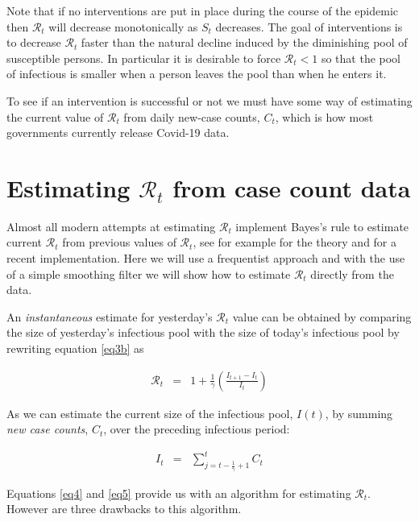 \documentclass[11pt]{article}
\begin{document}
Note that if no interventions are put in place during the course of the epidemic 
then $\mathcal{R}_t$ will decrease monotonically as $S_t$ decreases.
The goal of interventions is to decrease $\mathcal{R}_t$ faster than
the natural decline induced by the diminishing pool of susceptible persons.
In particular it is desirable to force $\mathcal{R}_t < 1$ so that 
the pool of infectious is smaller when a person leaves the pool
than when he enters it. 

To see if an intervention is successful or not we must have some
way of estimating the current value of $\mathcal{R}_t$ from 
daily new-case counts, $C_t$, which is how most governments currently
release Covid-19 data.

\section{Estimating $\mathcal{R}_t$ from case count data}

Almost all modern attempts at estimating $\mathcal{R}_t$ implement
Bayes's rule to estimate current $\mathcal{R}_t$ from previous values
of $\mathcal{R}_t$, see for example \cite{Bettencourt} for the theory 
and \cite{systrom} for a recent implementation. Here we will use a
frequentist approach and with the use of a simple smoothing filter
we will show how to estimate $\mathcal{R}_t$ directly from the data.

An {\it instantaneous} estimate for yesterday's $\mathcal{R}_t$ value can be obtained
by comparing the size of yesterday's infectious pool with the size
of today's infectious pool by rewriting equation \ref{eq3b} as 

\begin{eqnarray}
\mathcal{R}_t  & =  & 1 + \frac{1}{\gamma}  \left( \frac{ I_{t+1} - I_t} {I_t }  \right) \label{eq4} 
\end{eqnarray}

As we can estimate the current size of the infectious pool, $I(t)$,  by 
summing {\it new case counts}, $C_t$, over the preceding infectious period:

\begin{eqnarray}
I_t  & =  & \sum_{j=t-\frac{1}{\gamma}+1}^t C_t \label{eq5} 
\end{eqnarray}

Equations \ref{eq4} and \ref{eq5} provide us with an algorithm for estimating $\mathcal{R}_t$.
However are three drawbacks to this algorithm.
\end{document}
